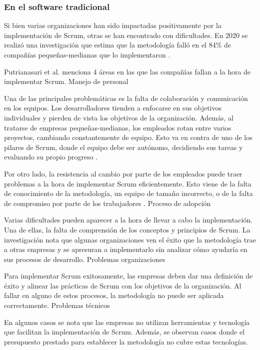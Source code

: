 \subsubsection{En el software tradicional}
\par Si bien varias organizaciones han sido impactadas positivamente por la implementación de Scrum, otras se han encontrado con dificultades. En 2020 se realizó una investigación que estima que la metodología falló en el 84\% de compañías pequeñas-medianas que lo implementaron \cite{putrianasariProblemsAdoptionAgileScrum2024}.
\par Putrianasari et al. \cite{putrianasariProblemsAdoptionAgileScrum2024} menciona 4 áreas en las que las compañías fallan a la hora de implementar Scrum.
\bigbreak
{\setlength{\parindent}{0cm}Manejo de personal}
\bigbreak
\par Una de las principales problemáticas es la falta de colaboración y comunicación en los equipos. Los desarrolladores tienden a enfocarse en sus objetivos individuales y pierden de vista los objetivos de la organización. Además, al tratarse de empresas pequeñas-medianas, los empleados rotan entre varios proyectos, cambiando constantemente de equipo. Esto va en contra de uno de los pilares de Scrum, donde el equipo debe ser autónomo, decidiendo sus tareas y evaluando su propio progreso \cite{putrianasariProblemsAdoptionAgileScrum2024}.
\bigbreak
\par Por otro lado, la resistencia al cambio por parte de los empleados puede traer problemas a la hora de implementar Scrum eficientemente. Esto viene de la falta de conocimiento de la metodología, un equipo de tamaño incorrecto, o de la falta de compromiso por parte de los trabajadores \cite{putrianasariProblemsAdoptionAgileScrum2024}.
\bigbreak
{\setlength{\parindent}{0cm}Proceso de adopción}
\bigbreak
\par Varias dificultades pueden aparecer a la hora de llevar a cabo la implementación. Una de ellas, la falta de comprensión de los conceptos y principios de Scrum. La investigación nota que algunas organizaciones ven el éxito que la metodología trae a otras empresas y se apresuran a implementarlo sin analizar cómo ayudaría en sus procesos de desarrollo.
\bigbreak
{\setlength{\parindent}{0cm}Problemas organizaciones}
\bigbreak
\par Para implementar Scrum exitosamente, las empresas deben dar una definición de éxito y alinear las prácticas de Scrum con los objetivos de la organización. Al fallar en alguno de estos procesos, la metodología no puede ser aplicada correctamente.
\bigbreak
{\setlength{\parindent}{0cm}Problemas técnicos}
\bigbreak
\par En algunos casos se nota que las empresas no utilizan herramientas y tecnología que facilitan la implementación de Scrum. Además, se observan casos donde el presupuesto prestado para establecer la metodología no cubre estas tecnologías.
%
